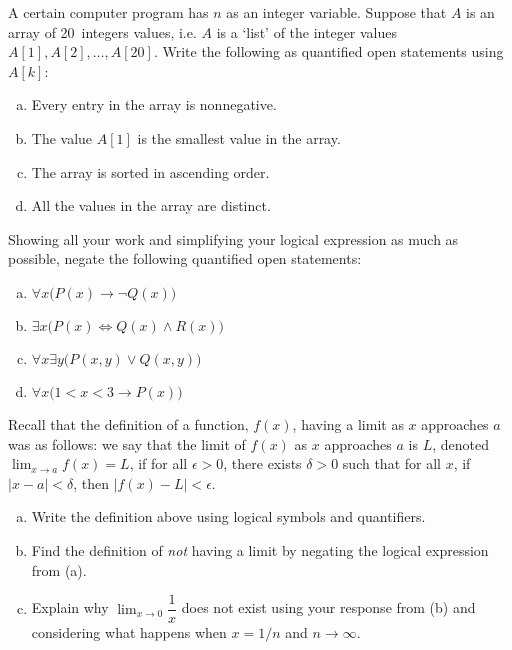 \documentclass[11pt,letterpaper]{article}
\begin{document}
\newpage



 A certain computer program has $n$ as an integer variable. Suppose that $A$ is an array of 20~integers values, i.e. $A$ is a `list' of the integer values $A[1], A[2], \ldots, A[20]$. Write the following as quantified open statements using $A[k]$:
	\begin{enumerate}[(a)]
	\item Every entry in the array is nonnegative.
	\item The value $A[1]$ is the smallest value in the array.
	\item The array is sorted in ascending order. 
	\item All the values in the array are distinct. 
	\end{enumerate}



\newpage



 Showing all your work and simplifying your logical expression as much as possible, negate the following quantified open statements:
	\begin{enumerate}[(a)]
	\item $\forall x \big( P(x) \to \neg Q(x) \big)$
	\item $\exists x \big( P(x) \Longleftrightarrow Q(x) \wedge R(x) \big)$
	\item $\forall x \exists y \big( P(x, y) \vee Q(x, y) \big)$
	\item $\forall x \big( 1 < x < 3 \to P(x) \big)$
	\end{enumerate}



\newpage



 Recall that the definition of a function, $f(x)$, having a limit as $x$ approaches $a$ was as follows: we say that the limit of $f(x)$ as $x$ approaches $a$ is $L$, denoted $\displaystyle \lim_{x \to a} f(x)= L$, if for all $\epsilon > 0$, there exists $\delta > 0$ such that for all $x$, if $|x - a| < \delta$, then $|f(x) - L| < \epsilon$. 
	\begin{enumerate}[(a)]
	\item Write the definition above using logical symbols and quantifiers.
	\item Find the definition of \textit{not} having a limit by negating the logical expression from (a).
	\item Explain why $\displaystyle \lim_{x \to 0} \dfrac{1}{x}$ does not exist using your response from (b) and considering what happens when $x= 1/n$ and $n \to \infty$. 
	\end{enumerate}
\end{document}
